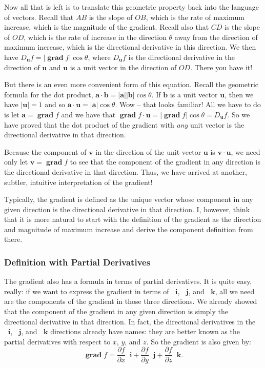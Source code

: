 \documentclass{myarticle}
\DeclareMathOperator{\grad}{\mathbf{grad}}
\renewcommand{\vec}[1]{\mathbf{#1}}
\newcommand{\unitvector}[1]{
  \mathop{}\!\vec{#1}
}
\newcommand{\ih}{\unitvector{i}}
\newcommand{\jh}{\unitvector{j}}
\newcommand{\kh}{\unitvector{k}}
\theoremstyle{nospace}
\newtheorem{old series theorem}{Theorem}
\newenvironment{series theorem}{\begin{mdframed}\begin{old series theorem}}{\end{old series theorem}\end{mdframed}}
\begin{document}
Now all that is left is to translate this geometric property back into the language of vectors. Recall that $AB$ is the slope of $OB$, which is the rate of maximum increase, which is the magnitude of the gradient. Recall also that $CD$ is the slope of $OD$, which is the rate of increase in the direction $\theta$ away from the direction of maximum increase, which is the directional derivative in this direction. We then have $D_{\vec u} f = |\grad f| \cos \theta$, where $D_{\vec u} f$ is the directional derivative in the direction of $\vec{u}$ and $\vec{u}$ is a unit vector in the direction of $OD$. There you have it!

But there is an even more convenient form of this equation. Recall the geometric formula for the dot product, $\vec{a} \cdot \vec{b} = |\vec{a}| |\vec{b}| \cos \theta$. If $\vec{b}$ is a unit vector $\vec{u}$, then we have $|\vec{u}| = 1$ and so $\vec{a} \cdot \vec{u} = |\vec{a}| \cos \theta$. Wow -- that looks familiar! All we have to do is let $\vec{a} = \grad f$ and we have that $\grad f \cdot \vec{u} = |\grad f| \cos \theta = D_{\vec{u}} f$. So we have proved that the dot product of the gradient with \textit{any} unit vector is the directional derivative in that direction.

Because the component of $\vec{v}$ in the direction of the unit vector $\vec{u}$ is $\vec{v} \cdot \vec{u}$, we need only let $\vec{v} = \grad f$ to see that the component of the gradient in any direction is the directional derivative in that direction. Thus, we have arrived at another, subtler, intuitive interpretation of the gradient!

Typically, the gradient is defined as the unique vector whose component in any given direction is the directional derivative in that direction. I, however, think that it is more natural to start with the definition of the gradient as the direction and magnitude of maximum increase and derive the component definition from there.

\subsubsection{Definition with Partial Derivatives} \label{sec:gradient definition with partial derivatives}

The gradient also has a formula in terms of partial derivatives. It is quite easy, really: if we want to express the gradient in terms of $\ih$, $\jh$, and $\kh$, all we need are the components of the gradient in those three directions. We already showed that the component of the gradient in any given direction is simply the directional derivative in that direction. In fact, the directional derivatives in the $\ih$, $\jh$, and $\kh$ directions already have names: they are better known as the partial derivatives with respect to $x$, $y$, and $z$. So the gradient is also given by: \[ \grad f = \frac{\partial f}{\partial x} \ih + \frac{\partial f}{\partial y} \jh + \frac{\partial f}{\partial z} \kh. \]
\end{document}

